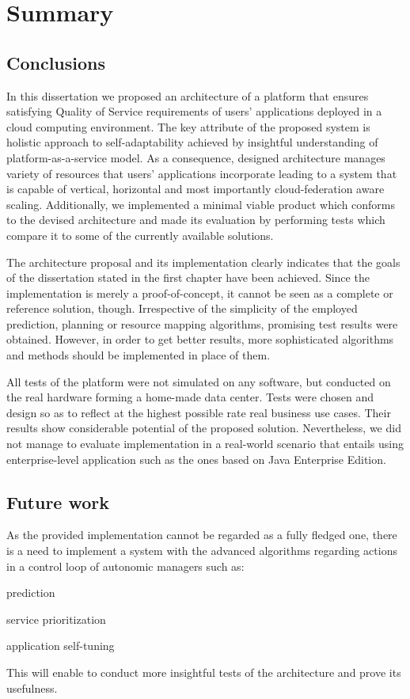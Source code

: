 \chapter{Summary}


\section{Conclusions}
In this dissertation we proposed an architecture of a platform that ensures satisfying Quality of Service requirements of users' applications deployed in a cloud computing environment. The key attribute of the proposed system is holistic approach to self-adaptability achieved by insightful understanding of platform-as-a-service model. As a consequence, designed architecture manages variety of resources that users' applications incorporate leading to a system that is capable of vertical, horizontal and most importantly cloud-federation aware scaling. Additionally, we implemented a minimal viable product which conforms to the devised architecture and made its evaluation by performing tests which compare it to some of the currently available solutions.

The architecture proposal and its implementation clearly indicates that the goals of the dissertation stated in the first chapter have been achieved. Since the implementation is merely a proof-of-concept, it cannot be seen as a complete or reference solution, though. Irrespective of the simplicity of the employed prediction, planning or resource mapping algorithms, promising test results were obtained. However, in order to get better results, more sophisticated algorithms and methods should be implemented in place of them.

All tests of the platform were not simulated on any software, but conducted on the real hardware forming a home-made data center. Tests were chosen and design so as to reflect at the highest possible rate real business use cases. Their results show considerable potential of the proposed solution. Nevertheless, we did not manage to evaluate implementation in a real-world scenario that entails using enterprise-level application such as the ones based on Java Enterprise Edition.

\section{Future work}
As the provided implementation cannot be regarded as a fully fledged one, there is a need to implement a system with the advanced algorithms regarding actions in a control loop of autonomic managers such as:
\begin{inparaenum}[1)]
  \item prediction
  \item service prioritization
  \item application self-tuning
\end{inparaenum}
This will enable to conduct more insightful tests of the architecture and prove its usefulness.

